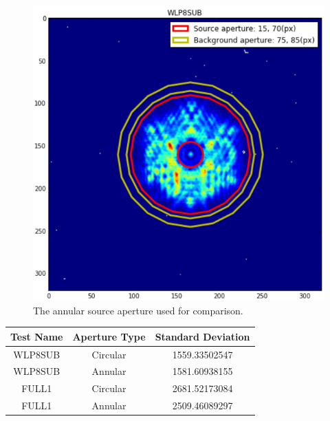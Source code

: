 \documentclass[conference]{IEEEtran}
\begin{document}
        \begin{figure}[H]
            \includegraphics[scale=0.4]{Annular_source}
            \caption{The annular source aperture used for comparison.}
        \end{figure}
        
        \begin{center}
            \centering
            \label{tab:table 1}
            \begin{tabular}{|c c c|}
                \hline
                 Test Name & Aperture Type & Standard Deviation  \\
                 \hline
                 WLP8SUB & Circular & 1559.33502547 \\
                 WLP8SUB & Annular & 1581.60938155 \\
                 FULL1 & Circular & 2681.52173084 \\
                 FULL1 & Annular & 2509.46089297 \\
                 \hline
            \end{tabular}
            \caption{Comparing between circular \& annular aperture}
        \end{center}
     
 
\end{document}
